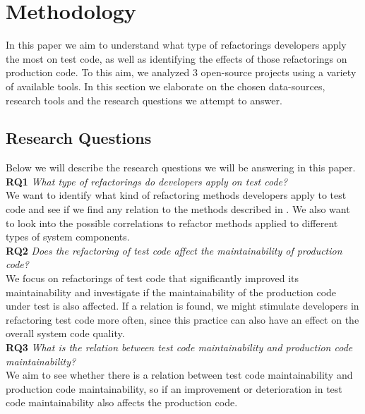 
\section{Methodology}
In this paper we aim to understand what type of refactorings developers apply the most on test code, as well as identifying the effects of those refactorings on production code. To this aim, we analyzed 3 open-source projects using a variety of available tools. In this section we elaborate on the chosen data-sources, research tools and the research questions we attempt to answer.

\subsection{Research Questions}
\label{rqs}
Below we will describe the research questions we will be answering in this paper.\\
\indent\textbf{RQ1} \textit{What type of refactorings do developers apply on test code?}\\
We want to identify what kind of refactoring methods developers apply to test code and see if we find any relation to the methods described in \cite{van2001refactoring}. We also want to look into the possible correlations to refactor methods applied to different types of system components.\\
\indent\textbf{RQ2} \textit{Does the refactoring of test code affect the maintainability of production code?}\\
We focus on refactorings of test code that significantly improved its maintainability and investigate if the maintainability of the production code under test is also affected. If a relation is found, we might stimulate developers in refactoring test code more often, since this practice can also have an effect on the overall system code quality.\\
\indent\textbf{RQ3} \textit{What is the relation between test code maintainability and production code maintainability?}\\
We aim to see whether there is a relation between test code maintainability and production code maintainability, so if an improvement or deterioration in test code maintainability also affects the production code. 

